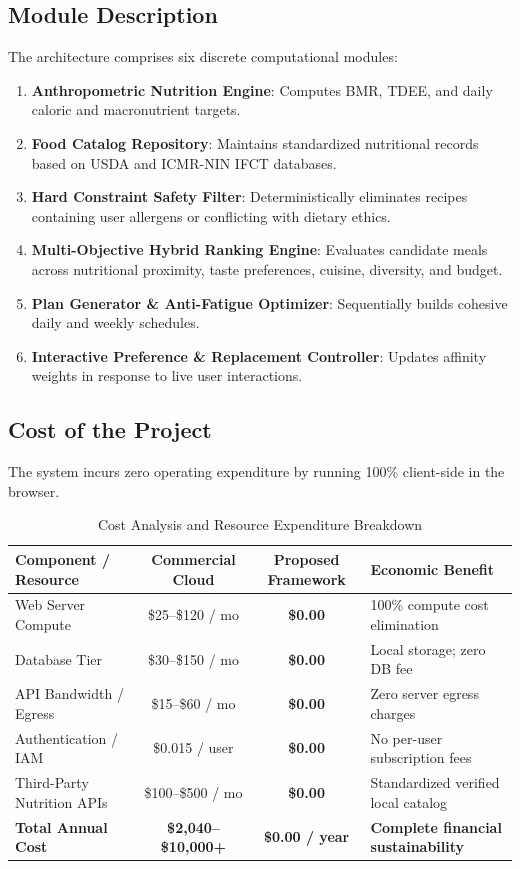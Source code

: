 \documentclass[12pt,a4paper]{report}
\begin{document}
\subsection{Module Description}
The architecture comprises six discrete computational modules:
\begin{enumerate}
    \item \textbf{Anthropometric Nutrition Engine}: Computes BMR, TDEE, and daily caloric and macronutrient targets.
    \item \textbf{Food Catalog Repository}: Maintains standardized nutritional records based on USDA and ICMR-NIN IFCT databases.
    \item \textbf{Hard Constraint Safety Filter}: Deterministically eliminates recipes containing user allergens or conflicting with dietary ethics.
    \item \textbf{Multi-Objective Hybrid Ranking Engine}: Evaluates candidate meals across nutritional proximity, taste preferences, cuisine, diversity, and budget.
    \item \textbf{Plan Generator \& Anti-Fatigue Optimizer}: Sequentially builds cohesive daily and weekly schedules.
    \item \textbf{Interactive Preference \& Replacement Controller}: Updates affinity weights in response to live user interactions.
\end{enumerate}

\subsection{Cost of the Project}
The system incurs zero operating expenditure by running 100\% client-side in the browser.

\begin{table}[htbp]
\centering
\caption{Cost Analysis and Resource Expenditure Breakdown}
\label{tab:cost_analysis}
\small
\begin{tabularx}{\textwidth}{l c c X}
\toprule
\textbf{Component / Resource} & \textbf{Commercial Cloud} & \textbf{Proposed Framework} & \textbf{Economic Benefit} \\
\midrule
Web Server Compute & \$25--\$120 / mo & \textbf{\$0.00} & 100\% compute cost elimination \\
Database Tier & \$30--\$150 / mo & \textbf{\$0.00} & Local storage; zero DB fee \\
API Bandwidth / Egress & \$15--\$60 / mo & \textbf{\$0.00} & Zero server egress charges \\
Authentication / IAM & \$0.015 / user & \textbf{\$0.00} & No per-user subscription fees \\
Third-Party Nutrition APIs & \$100--\$500 / mo & \textbf{\$0.00} & Standardized verified local catalog \\
\midrule
\textbf{Total Annual Cost} & \textbf{\$2,040--\$10,000+} & \textbf{\$0.00 / year} & \textbf{Complete financial sustainability} \\
\bottomrule
\end{tabularx}
\end{table}
\end{document}
